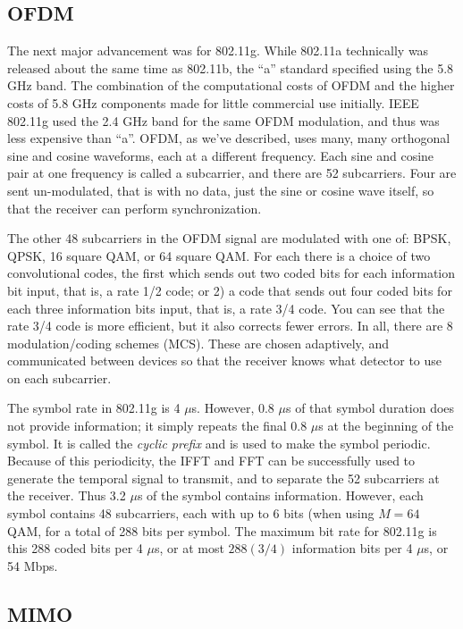 \subsection{OFDM}

The next major advancement was for 802.11g.  While 802.11a technically was released about the same time as 802.11b, the ``a'' standard specified using the 5.8 GHz band.  The combination of the computational costs of OFDM and the higher costs of 5.8 GHz components made for little commercial use initially.  IEEE 802.11g used the 2.4 GHz band for the same OFDM modulation, and thus was less expensive than ``a''.  OFDM, as we've described, uses many, many orthogonal sine and cosine waveforms, each at a different frequency.  Each sine and cosine pair at one frequency is called a subcarrier, and there are 52 subcarriers.  Four are sent un-modulated, that is with no data, just the sine or cosine wave itself, so that the receiver can perform synchronization.

The other 48 subcarriers in the OFDM signal are modulated with one of: BPSK, QPSK, 16 square QAM, or 64 square QAM.  For each there is a choice of two convolutional codes, the first which sends out two coded bits for each information bit input, that is, a rate 1/2 code; or 2) a code that sends out four coded bits for each three information bits input, that is, a rate 3/4 code.  You can see that the rate 3/4 code is more efficient, but it also corrects fewer errors.  In all, there are 8 modulation/coding schemes (MCS).  These are chosen adaptively, and communicated between devices so that the receiver knows what detector to use on each subcarrier.

The symbol rate in 802.11g is 4 $\mu$s.  However, 0.8 $\mu$s  of that symbol duration does not provide information; it simply repeats the final 0.8 $\mu$s at the beginning of the symbol.  It is called the \emph{cyclic prefix} and is used to make the symbol periodic.  Because of this periodicity, the IFFT and FFT can be successfully used to generate the temporal signal to transmit, and to separate the 52 subcarriers at the receiver.  Thus 3.2 $\mu$s of the symbol contains information.  However, each symbol contains 48 subcarriers, each with up to 6 bits (when using $M=64$ QAM, for a total of 288 bits per symbol. The maximum bit rate for 802.11g is this 288 coded bits per 4 $\mu$s, or at most $288(3/4)$ information bits per 4 $\mu$s, or 54 Mbps.  

\subsection{MIMO}

